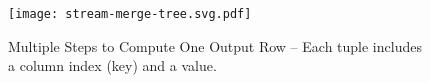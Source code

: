 \begin{figure}[tp]
  \centering
  \texttt{[image: stream-merge-tree.svg.pdf]}
  \caption{
    Multiple Steps to Compute One Output Row --
    Each tuple includes a column index (key) and a value.
  }
  \label{fig-spz-stream-merge-tree}
  \vspace{-0.2cm}
\end{figure}
